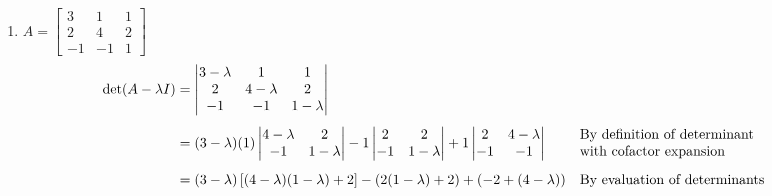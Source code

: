\documentclass[10pt,letterpaper,final]{report}
\newcommand{\reason}[1]{&& \text{#1}}
\begin{document}
\begin{enumerate}[label=(\alph*)]
  \item $A = \begin{bmatrix}
            3  & 1  & 1 \\
            2  & 4  & 2 \\
            -1 & -1 & 1
          \end{bmatrix}$
        \begin{align*}
          \det(A - \lambda I) & = \begin{vmatrix}
                                    3 - \lambda & 1           & 1           \\
                                    2           & 4 - \lambda & 2           \\
                                    -1          & -1          & 1 - \lambda
                                  \end{vmatrix}                                                                                                                                \\[1ex]
                              & = (3 - \lambda)(1)\begin{vmatrix}
                                                    4 - \lambda & 2           \\
                                                    -1          & 1 - \lambda
                                                  \end{vmatrix} - 1\begin{vmatrix}
                                                                     2  & 2           \\
                                                                     -1 & 1 - \lambda
                                                                   \end{vmatrix} + 1\begin{vmatrix}
                                                                                      2  & 4 - \lambda \\
                                                                                      -1 & -1
                                                                                    \end{vmatrix} \reason{\begin{tabular}[c]{@{}l@{}}By definition of determinant \\ with cofactor expansion\end{tabular}} \\[1ex]
                              & = (3 - \lambda)\left[(4 - \lambda)(1 - \lambda) + 2\right] - (2(1 - \lambda) + 2) + (-2 + (4 - \lambda)) \reason{By evaluation of determinants}                            \\[1ex]

\end{align*}
\end{enumerate}
\end{document}
